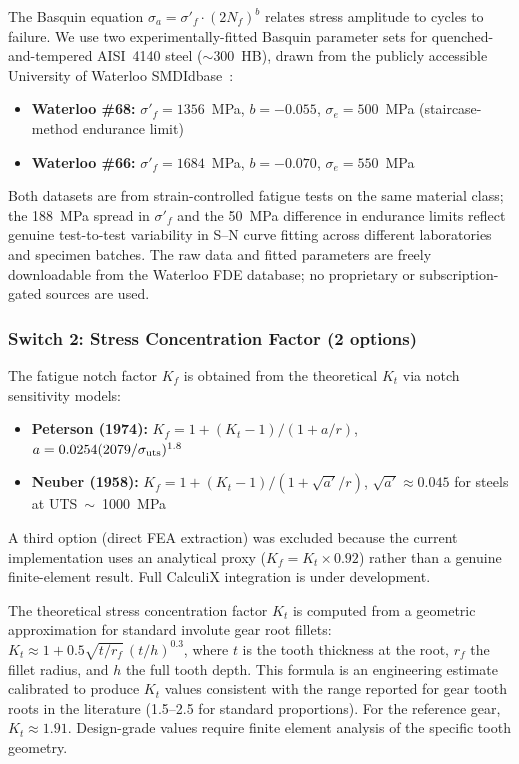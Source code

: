 \documentclass[12pt,a4paper]{article}
\begin{document}
The Basquin equation $\sigma_a = \sigma'_f \cdot (2N_f)^b$ relates stress
amplitude to cycles to failure. We use two experimentally-fitted Basquin parameter sets for
quenched-and-tempered AISI~4140 steel ($\sim$300~HB), drawn from
the publicly accessible University of Waterloo SMDIdbase~\cite{waterloo_fde}:

\begin{itemize}
  \item \textbf{Waterloo \#68:} $\sigma'_f = 1356$~MPa, $b=-0.055$,
        $\sigma_e=500$~MPa (staircase-method endurance limit)
  \item \textbf{Waterloo \#66:} $\sigma'_f = 1684$~MPa, $b=-0.070$,
        $\sigma_e=550$~MPa
\end{itemize}

Both datasets are from strain-controlled fatigue tests on the same
material class; the 188~MPa spread in $\sigma'_f$ and the 50~MPa
difference in endurance limits reflect genuine test-to-test variability
in S--N curve fitting across different laboratories and specimen batches.
The raw data and fitted parameters are freely downloadable from the
Waterloo FDE database; no proprietary or subscription-gated sources are
used.

\subsubsection{Switch 2: Stress Concentration Factor (2 options)}

The fatigue notch factor $K_f$ is obtained from the theoretical
$K_t$ via notch sensitivity models:

\begin{itemize}
  \item \textbf{Peterson (1974):}
        $K_f = 1 + (K_t-1)/(1+a/r)$, $a=0.0254(2079/\sigma_{\rm uts})^{1.8}$
  \item \textbf{Neuber (1958):}
        $K_f = 1 + (K_t-1)/(1+\sqrt{a'}/r)$, $\sqrt{a'}\approx0.045$
        for steels at UTS~$\sim$~1000~MPa
\end{itemize}

A third option (direct FEA extraction) was excluded because the current
implementation uses an analytical proxy ($K_f = K_t \times 0.92$) rather
than a genuine finite-element result. Full CalculiX integration is under
development.

The theoretical stress concentration factor $K_t$ is computed from a
geometric approximation for standard involute gear root fillets:
$K_t \approx 1 + 0.5\sqrt{t/r_f}\,(t/h)^{0.3}$, where $t$ is the tooth
thickness at the root, $r_f$ the fillet radius, and $h$ the full tooth
depth. This formula is an engineering estimate calibrated to produce
$K_t$ values consistent with the range reported for gear tooth roots in
the literature (1.5--2.5 for standard proportions). For the reference
gear, $K_t \approx 1.91$. Design-grade values require finite element
analysis of the specific tooth geometry.
\end{document}
